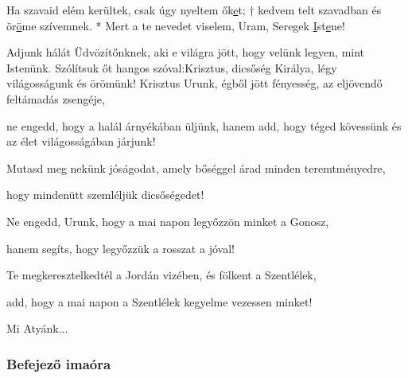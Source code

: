 \documentclass[twoside]{article}
\begin{document}
Ha szavaid elém kerültek, csak úgy nyeltem ők\underline{e}t; † kedvem telt szavadban és
ör\underline{ö}me szívemnek. * Mert a te nevedet viselem, Uram, Seregek
\underline{I}st\underline{e}ne!






\begin{preces}{Adjunk hálát Üdvözítőnknek, aki e világra jött, hogy velünk legyen, mint Istenünk.
Szólítsuk őt hangos szóval:}{Krisztus, dicsőség Királya, légy világosságunk és örömünk!}
  Krisztus Urunk, égből jött fényesség, az eljövendő feltámadás zsengéje,

  \reddash ne engedd, hogy a halál árnyékában üljünk, hanem add, hogy téged kövessünk és az élet világosságában járjunk!

  Mutasd meg nekünk jóságodat, amely bőséggel árad minden teremtményedre,

  \reddash hogy mindenütt szemléljük dicsőségedet!

  Ne engedd, Urunk, hogy a mai napon legyőzzön minket a Gonosz,

  \reddash hanem segíts, hogy legyőzzük a rosszat a jóval!

  Te megkeresztelkedtél a Jordán vizében, és fölkent a Szentlélek,

  \reddash add, hogy a mai napon a Szentlélek kegyelme vezessen minket!
\end{preces}
Mi Atyánk...


\label{f2/Compl}

\subsubsection*{Befejező imaóra}



\end{document}
